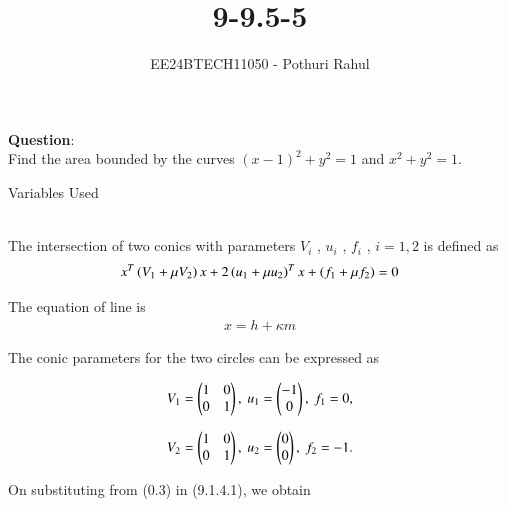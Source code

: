 \documentclass[journal]{IEEEtran}
\begin{document}

\vspace{3cm}

\title{9-9.5-5}
\author{EE24BTECH11050 - Pothuri Rahul}
{\let\newpage\relax\maketitle}

\renewcommand{\thefigure}{\theenumi}
\renewcommand{\thetable}{\theenumi}
\setlength{\intextsep}{10pt} %


\renewcommand{\thetable}{\theenumi}
\textbf{Question}:\\
Find the area bounded by the curves $(x-1)^2 + y^2 = 1$ and $x^2 + y^2 = 1$.  \\
\solution 
\begin{table}[h!]
    \centering
    
    \caption{Variables Used}
    \label{tab:9.5-5}
\end{table}
\\

The intersection of two conics with parameters $V_i$ , $u_i$ , $f_i$ , $i = 1, 2$ is defined as
\begin{align}
      x^T\left(V_1+\mu V_2\right)x+2\left(u_1+\mu u_2\right)^Tx+\left(f_1+\mu f_2\right)=0
\end{align}



The equation of line is
\begin{align}
x=h+\kappa m
\end{align}

The conic parameters for the two circles can be expressed as

 \begin{align}
V_1 = \begin{pmatrix}1 & 0 \\ 0 & 1\end{pmatrix}, \ u_1 = \begin{pmatrix} -1 \\ 0\end{pmatrix}, \ f_1 = 0, 
 \end{align}

 \begin{align}
V_2 = \begin{pmatrix}1 & 0 \\ 0 & 1\end{pmatrix}, \ u_2 = \begin{pmatrix}0 \\ 0\end{pmatrix}, \ f_2 = -1.
 \end{align}

On substituting from (0.3) in (9.1.4.1), we obtain
\end{document}
